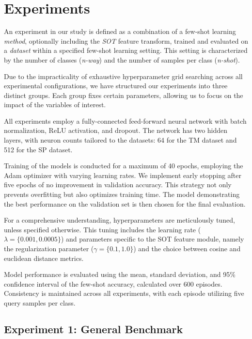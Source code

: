 \section{Experiments}

An experiment in our study is defined as a combination of a few-shot learning \textit{method}, optionally including the \textit{SOT} feature transform, trained and evaluated on a \textit{dataset} within a specified few-shot learning setting. This setting is characterized by the number of classes (\textit{n-way}) and the number of samples per class (\textit{n-shot}).

Due to the impracticality of exhaustive hyperparameter grid searching across all experimental configurations, we have structured our experiments into three distinct groups. Each group fixes certain parameters, allowing us to focus on the impact of the variables of interest.

All experiments employ a fully-connected feed-forward neural network with batch normalization, ReLU activation, and dropout. The network has two hidden layers, with neuron counts tailored to the datasets: 64 for the TM dataset and 512 for the SP dataset.

Training of the models is conducted for a maximum of 40 epochs, employing the Adam optimizer with varying learning rates. We implement early stopping after five epochs of no improvement in validation accuracy. This strategy not only prevents overfitting but also optimizes training time. The model demonstrating the best performance on the validation set is then chosen for the final evaluation.

For a comprehensive understanding, hyperparameters are meticulously tuned, unless specified otherwise. This tuning includes the learning rate ($\lambda = \{0.001, 0.0005\}$) and parameters specific to the SOT feature module, namely the regularization parameter ($\gamma = \{0.1, 1.0\}$) and the choice between cosine and euclidean distance metrics.


Model performance is evaluated using the mean, standard deviation, and 95\% confidence interval of the few-shot accuracy, calculated over 600 episodes. Consistency is maintained across all experiments, with each episode utilizing five query samples per class.

\subsection{Experiment 1: General Benchmark}

